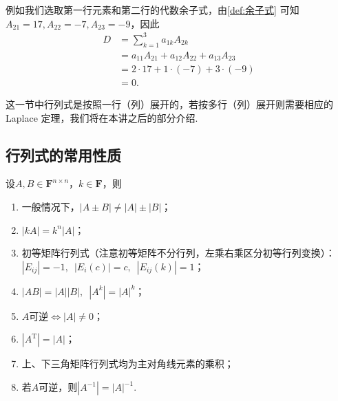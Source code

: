 \begin{solution}
    例如我们选取第一行元素和第二行的代数余子式，由\autoref{def:余子式} 可知$A_{21}=17,A_{22}=-7,A_{23}=-9$，因此
    \begin{align*}
        D & =\sum_{k=1}^{3}a_{1k}A_{2k}             \\
          & =a_{11}A_{21}+a_{12}A_{22}+a_{13}A_{23} \\
          & =2 \cdot 17+1 \cdot (-7)+3 \cdot (-9)   \\
          & =0.
    \end{align*}
\end{solution}

这一节中行列式是按照一行（列）展开的，若按多行（列）展开则需要相应的 Laplace 定理，我们将在本讲之后的部分介绍.

\subsection{行列式的常用性质}

设$A,B \in \mathbf{F}^{n \times n}$，$k \in \mathbf{F}$，则
\begin{enumerate}
    \item 一般情况下，$|A \pm B| \neq |A|\pm|B|$；

    \item $|kA|=k^n|A|$；

    \item \label{item:13:行列式性质:3}
          初等矩阵行列式（注意初等矩阵不分行列，左乘右乘区分初等行列变换）：\\
          $|E_{ij}|=-1,\enspace |E_i(c)|=c,\enspace |E_{ij}(k)|=1$；

    \item \label{item:13:行列式性质:4}
          $|AB|=|A||B|,\enspace|A^k|=|A|^k$；

    \item $A$可逆$\iff |A| \neq 0$；

    \item $|A^\mathrm{T}|=|A|$；

    \item 上、下三角矩阵行列式均为主对角线元素的乘积；

    \item 若$A$可逆，则$|A^{-1}|=|A|^{-1}$.

\end{enumerate}

